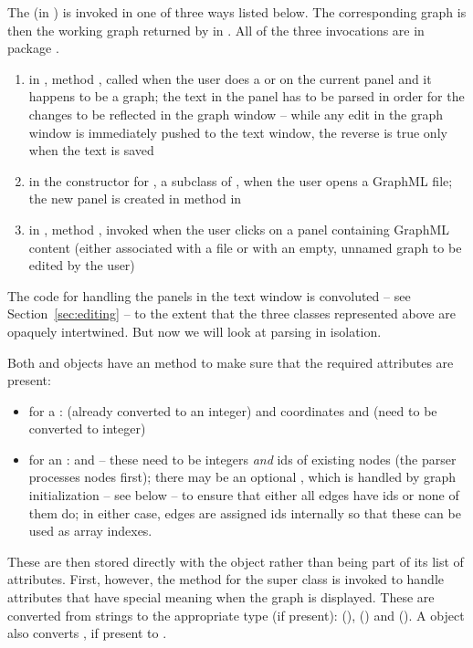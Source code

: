 The  (in ) is invoked in one of three
ways listed below. The corresponding graph is then the working graph
returned by  in .
All of the three invocations are in package
.
\begin{enumerate}
\item in , method , called when
  the user does a  or  on the current panel and it
  happens to be a graph; the text in the panel has to be parsed in order for
  the changes to be reflected in the graph window -- while any edit in the
  graph window is immediately pushed to the text window, the reverse is true
  only when the text is saved
\item in the constructor for , a subclass of
  , when the user opens a GraphML file; the new panel is
  created in method  in 
\item in , method , invoked when the
  user clicks on a panel containing GraphML content (either associated with a file or with an empty, unnamed graph to
  be edited by the user)
\end{enumerate}
The code for handling the panels in the text window is convoluted -- see
Section~\ref{sec:editing} -- to the extent that the three classes represented
above are opaquely intertwined. But now we will look at parsing in isolation.

Both  and  objects have an
 method to make sure that the required
attributes are present:
\begin{itemize}
  \item for a :  (already converted to an integer) and
    coordinates  and  (need to be converted to integer)
  \item for an :  and  -- these need to
    be integers \emph{and} ids of existing nodes (the parser processes nodes
    first); there may be an optional , which is handled by graph
    initialization -- see below -- to ensure that either all edges have ids
    or none of them do; in either case, edges are assigned ids internally so
    that these can be used as array indexes.
\end{itemize}
These are then stored directly with the object rather
than being part of its list of attributes.  First, however, the
 method for the super class
 is invoked to handle attributes that have special meaning
when the graph is displayed. These are converted from strings to the
appropriate type (if present):  (), 
() and  (). A  object
also converts , if present to .

